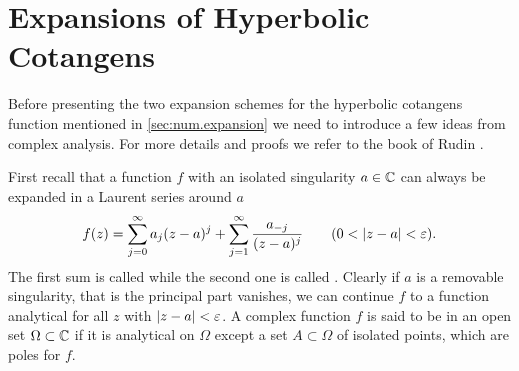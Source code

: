 \chapter{Expansions of Hyperbolic Cotangens}
\label{cha:coth}
%

Before presenting the two expansion schemes for the hyperbolic cotangens function mentioned in \autoref{sec:num.expansion} we need to introduce a few ideas from complex analysis.
For more details and proofs we refer to the book of Rudin \cite{Ru87_analysis}.

First recall that a function $f$ with an isolated singularity $a\in\mathbb{C}$ can always be expanded in a Laurent series around $a$
\begin{equation}
  f(z) = \sum_{j=0}^\infty a_j (z - a)^j + \sum_{j=1}^\infty \frac{a_{-j}}{(z-a)^j} \qquad (0 < \left\vert z-a \right\vert < \varepsilon).
  \label{eq:coth.laurent}
\end{equation}
The first sum is called  while the second one is called .
Clearly if $a$ is a removable singularity, that is the principal part vanishes, we can continue $f$ to a function analytical for all $z$ with $\left\vert z-a \right\vert < \varepsilon$.
A complex function $f$ is said to be  in an open set $\Omega\subset\mathbb{C}$ if it is analytical on $\Omega$ except a set $A \subset\Omega$ of isolated points, which are poles for $f$.

